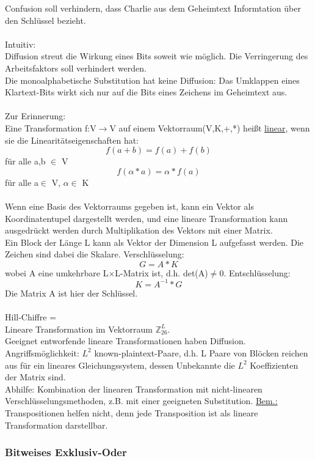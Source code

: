 \documentclass[a4paper,12pt]{article}
\begin{document}
Confusion soll verhindern, dass Charlie aus dem Geheimtext Informtation über den Schlüssel bezieht.\\
\\
Intuitiv:\\
Diffusion streut die Wirkung eines Bits soweit wie möglich. Die Verringerung des Arbeitsfaktors soll verhindert werden.\\
Die monoalphabetische Substitution hat keine Diffusion: Das Umklappen eines Klartext-Bits wirkt sich nur auf die Bits eines Zeichens im Geheimtext aus.\\
\\
Zur Erinnerung:\\
Eine Transformation f:V$\rightarrow$V auf einem Vektorraum(V,K,+,*) heißt \underline{linear}, wenn sie die Linearitätseigenschaften hat:\\
$$f(a+b)=f(a)+f(b)$$ für alle a,b $\in$ V
$$f(\alpha *a) = \alpha *f(a)$$ für alle a$\in$ V, $\alpha\in$ K \\
\\
Wenn eine Basis des Vektorraums gegeben ist, kann ein Vektor als Koordinatentupel dargestellt werden, und eine lineare Transformation kann ausgedrückt werden durch Multiplikation des Vektors mit einer Matrix.\\
Ein Block der Länge L kann als Vektor der Dimension L aufgefasst werden. Die Zeichen sind dabei die Skalare. Verschlüsselung:
$$G = A*K$$
wobei A eine umkehrbare L$\times$L-Matrix ist, d.h. det(A)$\neq0$. Entschlüsselung:
$$K = A^{-1}*G $$
Die Matrix A ist hier der Schlüssel.\\
\\
Hill-Chiffre =\\
Lineare Transformation im Vektorraum $\mathbb{Z}_{26}^L$.\\
Geeignet entworfende lineare Transformationen haben Diffusion.\\
Angriffsmöglichkeit:
$L^2$ known-plaintext-Paare, d.h. L Paare von Blöcken reichen aus für ein lineares Gleichungssystem, dessen Unbekannte die $L^2$ Koeffizienten der Matrix sind.\\
Abhilfe: Kombination der linearen Transformation mit nicht-linearen Verschlüsselungsmethoden, z.B. mit einer geeigneten Substitution.
\underline{Bem.:} Transpositionen helfen nicht, denn jede Transposition ist als lineare Transformation darstellbar.

\subsubsection{Bitweises Exklusiv-Oder}
\end{document}
